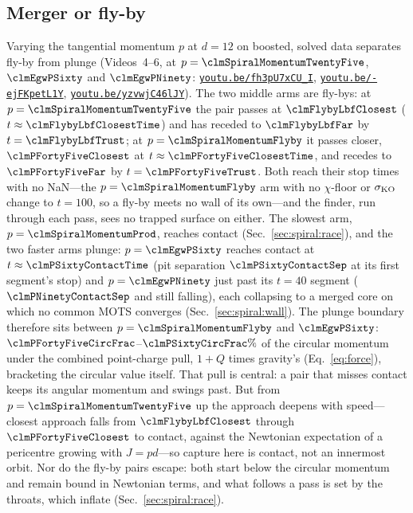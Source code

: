 \documentclass[twocolumn,floatfix,aps,prd,superscriptaddress,nofootinbib]{revtex4-2}
\begin{document}
\subsection{Merger or fly-by}
\label{sec:spiral:capture}

Varying the tangential momentum $p$ at $d=12$ on boosted, solved data separates fly-by from plunge (Videos~4--6, at $p=\clmSpiralMomentumTwentyFive$, $\clmEgwPSixty$ and $\clmEgwPNinety$: \href{https://youtu.be/fh3pU7xCU_I}{\nolinkurl{youtu.be/fh3pU7xCU_I}}, \href{https://youtu.be/-ejFKpetL1Y}{\nolinkurl{youtu.be/-ejFKpetL1Y}}, \href{https://youtu.be/yzvwjC46lJY}{\nolinkurl{youtu.be/yzvwjC46lJY}}). The two middle arms are fly-bys: at $p=\clmSpiralMomentumTwentyFive$ the pair passes at $\clmFlybyLbfClosest$ ($t\approx\clmFlybyLbfClosestTime$) and has receded to $\clmFlybyLbfFar$ by $t=\clmFlybyLbfTrust$; at $p=\clmSpiralMomentumFlyby$ it passes closer, $\clmPFortyFiveClosest$ at $t\approx\clmPFortyFiveClosestTime$, and recedes to $\clmPFortyFiveFar$ by $t=\clmPFortyFiveTrust$. Both reach their stop times with no NaN---the $p=\clmSpiralMomentumFlyby$ arm with no $\chi$-floor or $\sigma_{\rm KO}$ change to $t=100$, so a fly-by meets no wall of its own---and the finder, run through each pass, sees no trapped surface on either. The slowest arm, $p=\clmSpiralMomentumProd$, reaches contact (Sec.~\ref{sec:spiral:race}), and the two faster arms plunge: $p=\clmEgwPSixty$ reaches contact at $t\approx\clmPSixtyContactTime$ (pit separation $\clmPSixtyContactSep$ at its first segment's stop) and $p=\clmEgwPNinety$ just past its $t=40$ segment ($\clmPNinetyContactSep$ and still falling), each collapsing to a merged core on which no common MOTS converges (Sec.~\ref{sec:spiral:wall}). The plunge boundary therefore sits between $p=\clmSpiralMomentumFlyby$ and $\clmEgwPSixty$: $\clmPFortyFiveCircFrac$--$\clmPSixtyCircFrac\%$ of the circular momentum under the combined point-charge pull, $1+Q$ times gravity's (Eq.~\eqref{eq:force}), bracketing the circular value itself. That pull is central: a pair that misses contact keeps its angular momentum and swings past. But from $p=\clmSpiralMomentumTwentyFive$ up the approach deepens with speed---closest approach falls from $\clmFlybyLbfClosest$ through $\clmPFortyFiveClosest$ to contact, against the Newtonian expectation of a pericentre growing with $J=pd$---so capture here is contact, not an innermost orbit. Nor do the fly-by pairs escape: both start below the circular momentum and remain bound in Newtonian terms, and what follows a pass is set by the throats, which inflate (Sec.~\ref{sec:spiral:race}).
\end{document}
